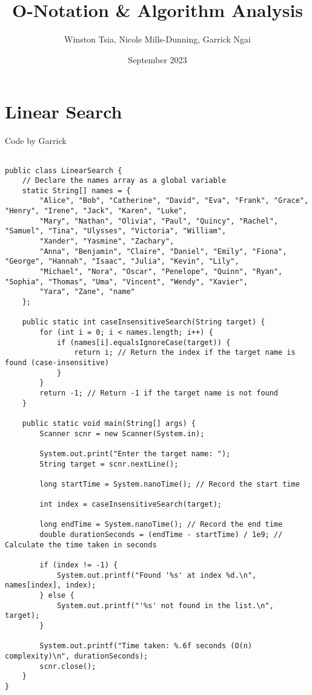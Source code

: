 \documentclass{article}
\title{O-Notation \& Algorithm Analysis}
\author{Winston Tsia, Nicole Mills-Dunning, Garrick Ngai}
\date{September 2023}
\begin{document}
\maketitle

\section{Linear Search}
Code by Garrick
\begin{verbatim}

public class LinearSearch {
    // Declare the names array as a global variable
    static String[] names = {
        "Alice", "Bob", "Catherine", "David", "Eva", "Frank", "Grace", "Henry", "Irene", "Jack", "Karen", "Luke",
        "Mary", "Nathan", "Olivia", "Paul", "Quincy", "Rachel", "Samuel", "Tina", "Ulysses", "Victoria", "William",
        "Xander", "Yasmine", "Zachary",
        "Anna", "Benjamin", "Claire", "Daniel", "Emily", "Fiona", "George", "Hannah", "Isaac", "Julia", "Kevin", "Lily",
        "Michael", "Nora", "Oscar", "Penelope", "Quinn", "Ryan", "Sophia", "Thomas", "Uma", "Vincent", "Wendy", "Xavier",
        "Yara", "Zane", "name"
    };

    public static int caseInsensitiveSearch(String target) {
        for (int i = 0; i < names.length; i++) {
            if (names[i].equalsIgnoreCase(target)) {
                return i; // Return the index if the target name is found (case-insensitive)
            }
        }
        return -1; // Return -1 if the target name is not found
    }

    public static void main(String[] args) {
        Scanner scnr = new Scanner(System.in);

        System.out.print("Enter the target name: ");
        String target = scnr.nextLine();

        long startTime = System.nanoTime(); // Record the start time

        int index = caseInsensitiveSearch(target);

        long endTime = System.nanoTime(); // Record the end time
        double durationSeconds = (endTime - startTime) / 1e9; // Calculate the time taken in seconds

        if (index != -1) {
            System.out.printf("Found '%s' at index %d.\n", names[index], index);
        } else {
            System.out.printf("'%s' not found in the list.\n", target);
        }

        System.out.printf("Time taken: %.6f seconds (O(n) complexity)\n", durationSeconds);
        scnr.close();
    }
}
\end{verbatim}
\end{document}
